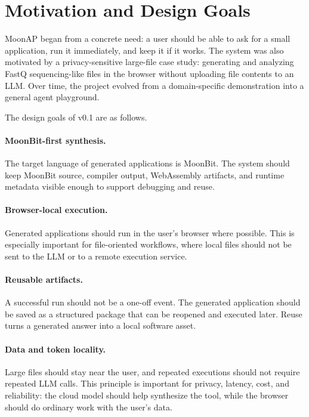 \documentclass[11pt]{article}
\newcommand{\moonap}{MoonAP}
\newcommand{\wasm}{WebAssembly}
\begin{document}
\section{Motivation and Design Goals}

\moonap{} began from a concrete need: a user should be able to ask for a small application, run it immediately, and keep it if it works. The system was also motivated by a privacy-sensitive large-file case study: generating and analyzing FastQ sequencing-like files in the browser without uploading file contents to an LLM. Over time, the project evolved from a domain-specific demonstration into a general agent playground.

The design goals of v0.1 are as follows.

\paragraph{MoonBit-first synthesis.}
The target language of generated applications is MoonBit. The system should keep MoonBit source, compiler output, \wasm{} artifacts, and runtime metadata visible enough to support debugging and reuse.

\paragraph{Browser-local execution.}
Generated applications should run in the user's browser where possible. This is especially important for file-oriented workflows, where local files should not be sent to the LLM or to a remote execution service.

\paragraph{Reusable artifacts.}
A successful run should not be a one-off event. The generated application should be saved as a structured package that can be reopened and executed later. Reuse turns a generated answer into a local software asset.

\paragraph{Data and token locality.}
Large files should stay near the user, and repeated executions should not require repeated LLM calls. This principle is important for privacy, latency, cost, and reliability: the cloud model should help synthesize the tool, while the browser should do ordinary work with the user's data.
\end{document}
